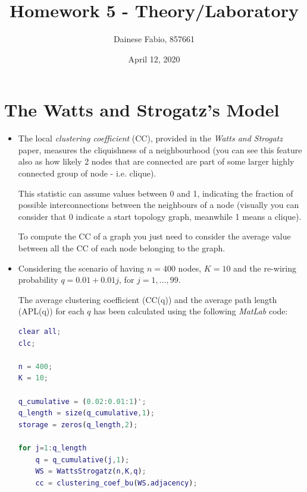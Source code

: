 \documentclass{article}
\title{Homework 5 - Theory/Laboratory}
\author{Dainese Fabio, 857661}
\date{April 12, 2020}
\begin{document}
\maketitle

\section{The Watts and Strogatz’s Model}
    \begin{itemize}
        \item The local \textit{clustering coefficient} (CC),  provided in the \textit{Watts and Strogatz} paper, measures the cliquishness of a neighbourhood (you can see this feature also as how likely 2 nodes that are connected are part of some larger highly connected group of node - i.e. clique).\newline
        
        \par\noindent This statistic can assume values between 0 and 1, indicating the fraction of possible interconnections between the neighbours of a node (visually you can consider that 0 indicate a start topology graph, meanwhile 1 means a clique).\newline
        
        \par\noindent To compute the CC of a graph you just need to consider the average value between all the CC of each node belonging to the graph.
        
    
        \item Considering the scenario of having \(n = 400\) nodes, \(K = 10\) and the re-wiring probability \(q = 0.01 + 0.01j\), for \(j = 1,...,99\). \newline
        
        \par\noindent The average clustering coefficient (CC(q)) and the average path length (APL(q)) for each \(q\) has been calculated using the following \textit{MatLab} code:\newline
        
        \begin{lstlisting}[language=Matlab]
clear all;
clc;

n = 400;
K = 10;

q_cumulative = (0.02:0.01:1)';
q_length = size(q_cumulative,1);
storage = zeros(q_length,2);

for j=1:q_length
    q = q_cumulative(j,1);
    WS = WattsStrogatz(n,K,q);
    cc = clustering_coef_bu(WS.adjacency);
    

\end{lstlisting}
\end{itemize}
\end{document}
